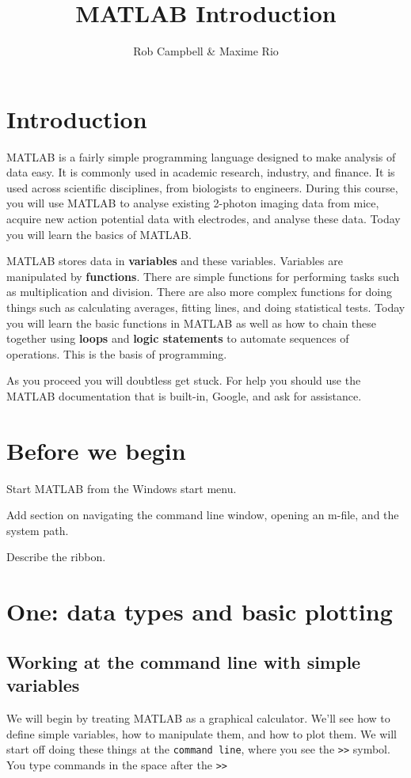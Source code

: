 \documentclass{article}
\title{MATLAB Introduction}
\author{Rob Campbell \& Maxime Rio}
\begin{document}
\maketitle


\section*{Introduction}

MATLAB is a fairly simple programming language designed to make analysis of data easy. It is commonly used in 
academic research, industry, and finance. It is used across scientific disciplines, from biologists to engineers.
During this course, you will use MATLAB to analyse existing 2-photon imaging data from mice, acquire new action 
potential data with electrodes, and analyse these data. Today you will learn the basics of MATLAB.


MATLAB stores data in \textbf{variables} and these variables. Variables are manipulated by \textbf{functions}.
There are simple functions for performing tasks such as multiplication and division. There are also more 
complex functions for doing things such as calculating averages, fitting lines, and doing statistical tests.
Today you will learn the basic functions in MATLAB as well as how to chain these together using \textbf{loops}
and \textbf{logic statements} to automate sequences of operations. This is the basis of programming. 

As you proceed you will doubtless get stuck. For help you should use the MATLAB documentation that is built-in, 
Google, and ask for assistance. 



\pagebreak

\section*{Before we begin}

Start MATLAB from the Windows start menu. 

Add section on navigating the command line window, opening an m-file, and the system path.

Describe the ribbon. 


\pagebreak
\section*{One: data types and basic plotting}

\subsection*{Working at the command line with simple variables}
We will begin by treating MATLAB as a graphical calculator. We'll see how to define simple variables, how to manipulate them, 
and how to plot them. We will start off doing these things at the \verb|command line|, where you see the \verb|>>| symbol. You type
commands in the space after the \verb|>>|
\end{document}
